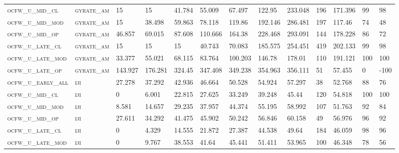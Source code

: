 \begin{landscape}
\begin{center}
\begin{footnotesize}
\begin{longtable}{lllllllllllll}
\textsc{ocfw\_u\_mid\_cl   } & \textsc{gyrate\_am}   & 15       & 15       & 41.784   & 55.009   & 67.497   & 122.95   & 233.048   & 196    & 171.396       & 99            & 98       \\
\textsc{ocfw\_u\_mid\_mod  } & \textsc{gyrate\_am}   & 15       & 38.498   & 59.863   & 78.118   & 119.86   & 192.146  & 286.481   & 197    & 117.46        & 74            & 48       \\
\textsc{ocfw\_u\_mid\_op   } & \textsc{gyrate\_am}   & 46.857   & 69.015   & 87.608   & 110.666  & 164.38   & 228.468  & 293.091   & 144    & 178.228       & 86            & 72       \\
\textsc{ocfw\_u\_late\_cl  } & \textsc{gyrate\_am}   & 15       & 15       & 15       & 40.743   & 70.083   & 185.575  & 254.451   & 419    & 202.133       & 99            & 98       \\
\textsc{ocfw\_u\_late\_mod } & \textsc{gyrate\_am}   & 33.377   & 55.021   & 68.115   & 83.764   & 100.203  & 146.78   & 178.01    & 110    & 191.121       & 100           & 100      \\
\textsc{ocfw\_u\_late\_op  } & \textsc{gyrate\_am}   & 143.927  & 176.281  & 324.45   & 347.408  & 349.238  & 354.963  & 356.111   & 51     & 57.455        & 0             & -100     \\
\textsc{ocfw\_u\_early\_all} & \textsc{iji       }   & 27.278   & 37.292   & 42.936   & 46.664   & 50.528   & 54.924   & 57.297    & 38     & 52.768        & 88            & 76       \\
\textsc{ocfw\_u\_mid\_cl   } & \textsc{iji       }   & 0        & 6.001    & 22.815   & 27.625   & 33.249   & 39.248   & 45.44     & 120    & 54.818        & 100           & 100      \\
\textsc{ocfw\_u\_mid\_mod  } & \textsc{iji       }   & 8.581    & 14.657   & 29.235   & 37.957   & 44.374   & 55.195   & 58.992    & 107    & 51.763        & 92            & 84       \\
\textsc{ocfw\_u\_mid\_op   } & \textsc{iji       }   & 27.611   & 34.292   & 41.475   & 45.902   & 50.242   & 56.846   & 60.158    & 49     & 56.976        & 96            & 92       \\
\textsc{ocfw\_u\_late\_cl  } & \textsc{iji       }   & 0        & 4.329    & 14.555   & 21.872   & 27.387   & 44.538   & 49.64     & 184    & 46.059        & 98            & 96       \\
\textsc{ocfw\_u\_late\_mod } & \textsc{iji       }   & 0        & 9.767    & 38.553   & 41.64    & 45.441   & 51.411   & 53.965    & 100    & 46.348        & 78            & 56       \\

\end{longtable}
\end{footnotesize}
\end{center}
\end{landscape}
